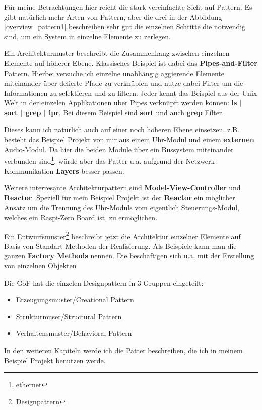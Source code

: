 \documentclass[a4paper, 12pt] {article}
\begin{document}
Für meine Betrachtungen hier reicht die stark vereinfachte Sicht auf Pattern. Es gibt natürlich mehr Arten von Pattern, aber die drei in der Abbildung \ref{overview_pattern1} beschreiben sehr gut die einzelnen Schritte die notwendig sind, um ein System in einzelne Elemente zu zerlegen.

Ein Architekturmuster beschreibt die Zusammenhang zwischen einzelnen Elemente auf höherer Ebene. Klassisches Beispiel ist dabei das \textbf{\glqq Pipes-and-Filter\grqq} Pattern. Hierbei versuche ich einzelne unabhängig aggierende Elemente miteinander über defierte Pfade zu verknüpfen und nutze dabei Filter um die Informationen zu selektieren und zu filtern. Jeder kennt das Beispiel aus der Unix Welt in der einzelen Applikationen über Pipes verknüpft werden können: \textbf{\glqq ls | sort | grep | lpr\grqq}. Bei diesem Beispiel sind \textbf{sort} und auch \textbf{grep} Filter.

Dieses kann ich natürlich auch auf einer noch höheren Ebene einsetzen, z.B. besteht das Beispiel Projekt von mir aus einem Uhr-Modul und einem \textbf{externen} Audio-Modul. Da hier die beiden Module über ein Bussystem miteinander verbunden sind\footnote{ethernet}, würde aber das Patter u.a. aufgrund der Netzwerk-Kommunikation \textbf{\glqq Layers\grqq} besser passen.

Weitere interresante Architekturpattern sind \textbf{\glqq Model-View-Controller\grqq} und \textbf{\glqq Reactor\grqq}. Speziell für mein Beispiel Projekt ist der \textbf{\glqq Reactor\grqq} ein möglicher Ansatz um die Trennung des Uhr-Moduls vom eigentlich Steuerungs-Modul, welches ein Raspi-Zero Board ist, zu ermöglichen.

Ein Entwurfsmuster\footnote{Designpattern} beschreibt jetzt die Architektur einzelner Elemente auf Basis von Standart-Methoden der Realisierung. Als Beispiele kann man die ganzen \textbf{Factory Methods} nennen. Die beschäftigen sich u.a. mit der Erstellung von einzelnen Objekten

Die GoF hat die einzelen Designpattern in 3 Gruppen eingeteilt:
\begin{itemize}
  \item{Erzeugungsmuster/Creational Pattern}
  \item{Strukturmuser/Structural Pattern}
  \item{Verhaltensmuster/Behavioral Pattern}
\end{itemize}

In den weiteren Kapiteln werde ich die Patter beschreiben, die ich in meinem Beispiel Projekt benutzen werde.
\end{document}
